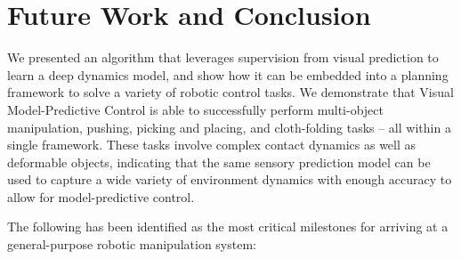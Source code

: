 \documentclass[10pt,journal,compsoc]{IEEEtran}
\begin{document}









\section{Future Work and Conclusion}
We presented an algorithm that leverages supervision from visual prediction to learn a deep dynamics model, and show how it can be embedded into a  planning framework to solve a variety of robotic control tasks. 
We demonstrate that Visual Model-Predictive Control
is able to successfully perform multi-object manipulation, pushing, picking and placing, and cloth-folding tasks -- all within a single framework. These tasks involve complex contact dynamics as well as deformable objects, indicating that the same sensory prediction model can be used to capture a wide variety of environment dynamics with enough accuracy to allow for model-predictive control.

The following has been identified as the most critical milestones for arriving at a general-purpose robotic manipulation system:
\end{document}
